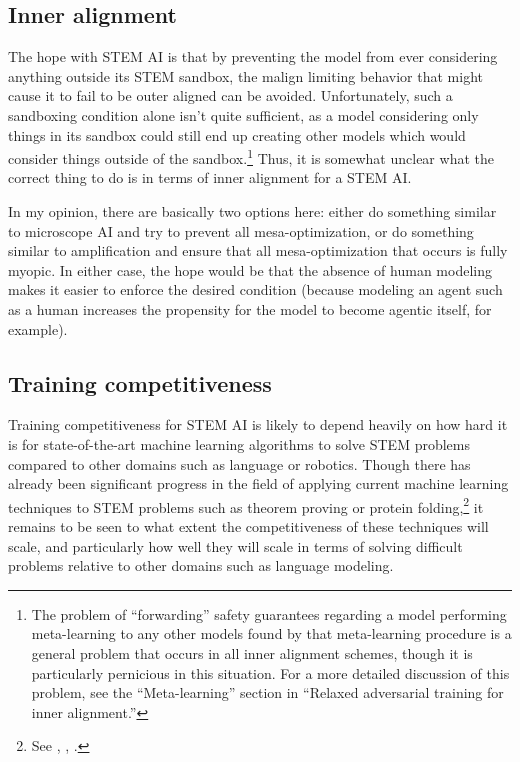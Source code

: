 \documentclass[
  onecolumn,
  natbib,
]{miri-tech-article}
\begin{document}
\subsection{Inner alignment} The hope with STEM AI is that by preventing the model from ever considering anything outside its STEM sandbox, the malign limiting behavior that might cause it to fail to be outer aligned can be avoided. Unfortunately, such a sandboxing condition alone isn't quite sufficient, as a model considering only things in its sandbox could still end up creating other models which would consider things outside of the sandbox.\footnote{The problem of ``forwarding'' safety guarantees regarding a model performing meta-learning to any other models found by that meta-learning procedure is a general problem that occurs in all inner alignment schemes, though it is particularly pernicious in this situation. For a more detailed discussion of this problem, see the ``Meta-learning'' section in ``Relaxed adversarial training for inner alignment.''\cite{relaxed}} Thus, it is somewhat unclear what the correct thing to do is in terms of inner alignment for a STEM AI.

In my opinion, there are basically two options here: either do something similar to microscope AI and try to prevent all mesa-optimization, or do something similar to amplification and ensure that all mesa-optimization that occurs is fully myopic. In either case, the hope would be that the absence of human modeling makes it easier to enforce the desired condition (because modeling an agent such as a human increases the propensity for the model to become agentic itself, for example).

\subsection{Training competitiveness} Training competitiveness for STEM AI is likely to depend heavily on how hard it is for state-of-the-art machine learning algorithms to solve STEM problems compared to other domains such as language or robotics. Though there has already been significant progress in the field of applying current machine learning techniques to STEM problems such as theorem proving or protein folding,\footnote{See \cite{theorem_proving}, \cite{holist}, \cite{protein}.} it remains to be seen to what extent the competitiveness of these techniques will scale, and particularly how well they will scale in terms of solving difficult problems relative to other domains such as language modeling.
\end{document}
